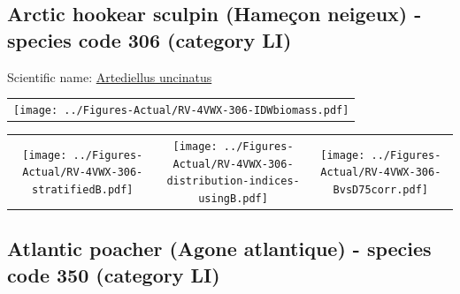 \documentclass[12pt]{article}\usepackage[]{graphicx}\usepackage[]{color}
\begin{document}
\renewcommand\thefigure{\thesubsection\Alph{figure}}

\setcounter{figure}{0}

\hypertarget{sec:306}{%
\subsection{Arctic hookear sculpin (Hameçon neigeux) - species code 306 (category LI)}\label{sec:306}}

  


Scientific name: \href{http://www.marinespecies.org/aphia.php?p=taxdetails\&id=127195}{Artediellus uncinatus} \newline
\begin{minipage}{1.0\textwidth}
 \begin{tabular}{c}
\texttt{[image: ../Figures-Actual/RV-4VWX-306-IDWbiomass.pdf]} \\ 
\end{tabular} 
\end{minipage}
\newline

\vspace{1cm}
\begin{minipage}{1.0\textwidth}
 \begin{tabular}{ccc}
\texttt{[image: ../Figures-Actual/RV-4VWX-306-stratifiedB.pdf]} & 
\texttt{[image: ../Figures-Actual/RV-4VWX-306-distribution-indices-usingB.pdf]} & 
\texttt{[image: ../Figures-Actual/RV-4VWX-306-BvsD75corr.pdf]} \\ 
\end{tabular} 
\end{minipage}
\clearpage

\renewcommand\thefigure{\thesubsection\Alph{figure}}

\setcounter{figure}{0}

\hypertarget{sec:350}{%
\subsection{Atlantic poacher (Agone atlantique) - species code 350 (category LI)}\label{sec:350}}
\end{document}
